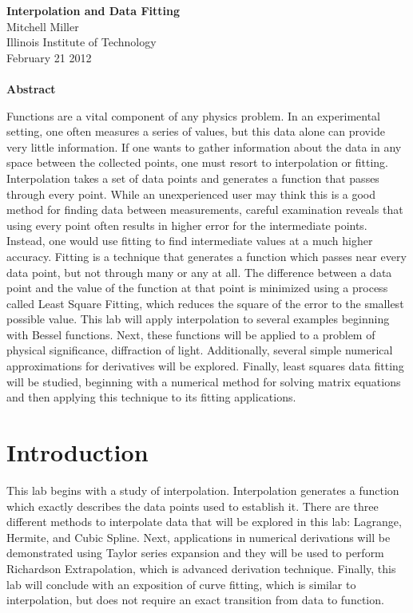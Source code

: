 \documentclass[12pt]{article}
\begin{document}
\begin{center}
\textbf{Interpolation and Data Fitting} \\ 
Mitchell Miller \\
Illinois Institute of Technology \\
February  21 2012 {\ \\ \ \\}
\textbf{Abstract}\\
\end{center}
\noindent
Functions are a vital component of any physics problem.  In an experimental setting, one often measures a series of values, but this data alone can provide very little information.  If one wants to gather information about the data in any space between the collected points, one must resort to interpolation or fitting.  Interpolation takes a set of data points and generates a function that passes through every point.  While an unexperienced user may think this is a good method for finding data between measurements, careful examination reveals that using every point often results in higher error for the intermediate points.  Instead, one would use fitting to find intermediate values at a much higher accuracy.  Fitting is a technique that generates a function which passes near every data point, but not through many or any at all.  The difference between a data point and the value of the function at that point is minimized using a process called Least Square Fitting, which reduces the square of the error to the smallest possible value.  This lab will apply interpolation to several examples beginning with Bessel functions.  Next, these functions will be applied to a problem of physical significance, diffraction of light.  Additionally, several simple numerical approximations for derivatives will be explored.  Finally, least squares data fitting will be studied, beginning with a numerical method for solving matrix equations and then applying this technique to its fitting applications.
\pagebreak
\section{Introduction}
This lab begins with a study of interpolation.  Interpolation generates a function which exactly describes the data points used to establish it.  There are three different methods to interpolate data that will be explored in this lab:  Lagrange, Hermite, and Cubic Spline.  Next, applications in numerical derivations will be demonstrated using Taylor series expansion and they will be used to perform Richardson Extrapolation, which is advanced derivation technique.  Finally, this lab will conclude with an exposition of curve fitting, which is similar to interpolation, but does not require an exact transition from data to function.  
\end{document}
